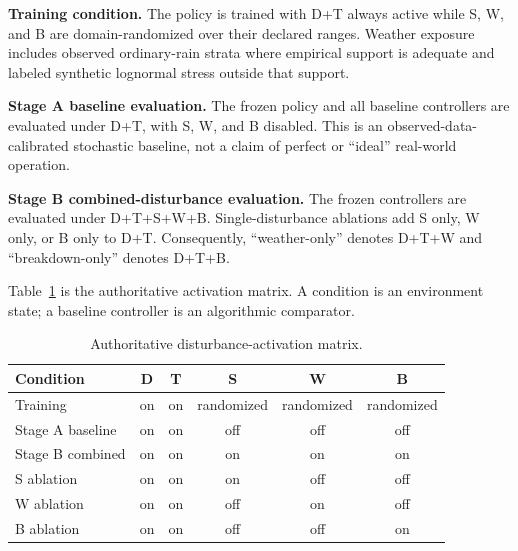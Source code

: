 \textbf{Training condition.} The policy is trained with D+T always active while S, W, and B are domain-randomized over their declared ranges. Weather exposure includes observed ordinary-rain strata where empirical support is adequate and labeled synthetic lognormal stress outside that support.

\textbf{Stage A baseline evaluation.} The frozen policy and all baseline controllers are evaluated under D+T, with S, W, and B disabled. This is an observed-data-calibrated stochastic baseline, not a claim of perfect or ``ideal'' real-world operation.

\textbf{Stage B combined-disturbance evaluation.} The frozen controllers are evaluated under D+T+S+W+B. Single-disturbance ablations add S only, W only, or B only to D+T. Consequently, ``weather-only'' denotes D+T+W and ``breakdown-only'' denotes D+T+B.

Table~\ref{tab:activation-matrix} is the authoritative activation matrix. A condition is an environment state; a baseline controller is an algorithmic comparator.

\begin{table}[htbp]
\centering
\caption{Authoritative disturbance-activation matrix.}
\label{tab:activation-matrix}
\small
\begin{tabularx}{\textwidth}{Xccccc}
\toprule
\textbf{Condition} & \textbf{D} & \textbf{T} & \textbf{S} & \textbf{W} & \textbf{B} \\
\midrule
Training & on & on & randomized & randomized & randomized \\
Stage A baseline & on & on & off & off & off \\
Stage B combined & on & on & on & on & on \\
S ablation & on & on & on & off & off \\
W ablation & on & on & off & on & off \\
B ablation & on & on & off & off & on \\
\bottomrule
\end{tabularx}
\end{table}


